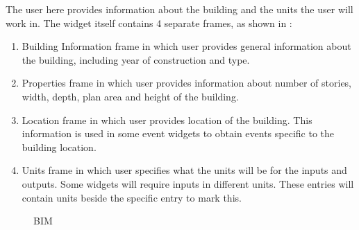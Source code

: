 The user here provides information about the building and the units
the user will work in. The widget itself contains 4 separate frames,
as shown in :

\begin{enumerate}
\item Building Information frame in which user provides general information about the building, including year of construction and type.
\item Properties frame in which user provides information about number of stories, width, depth, plan area and height of the building.
\item Location frame in which user provides location of the building. This information is used in some event widgets to obtain events specific to the building location.
\item Units frame in which user specifies what the units will be for the inputs and outputs. Some widgets will require inputs in different units. These entries will contain units beside the specific entry to mark this.
\end{enumerate}

\begin{figure}[!htbp]
  \caption{BIM}
  \label{fig:figure2}
\end{figure}

